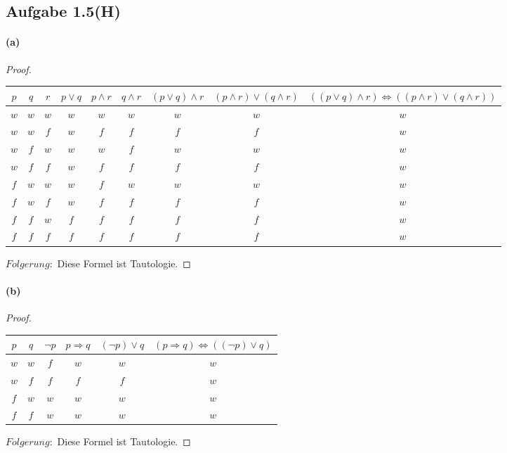 \newpage

\subsection{Aufgabe 1.5(H)}

\paragraph{(a)}
\begin{proof}
$ $\newline
\begin{center}
\begin{tabular}{||c|c|c||c|c|c|c|c|c||}
\hline
$p$ & $q$ & $r$ & $p\vee q$ & $p\wedge r$ & $q\wedge r$ & $(p\vee q)\wedge r$ & $(p\wedge r)\vee(q\wedge r)$ & $((p\vee q)\wedge r)\Leftrightarrow((p\wedge r)\vee(q\wedge r))$ \\
\hline
\hline
$w$ & $w$ & $w$ & $w$ & $w$ & $w$ & $w$ & $w$ & $w$ \\
$w$ & $w$ & $f$ & $w$ & $f$ & $f$ & $f$ & $f$ & $w$ \\
$w$ & $f$ & $w$ & $w$ & $w$ & $f$ & $w$ & $w$ & $w$ \\
$w$ & $f$ & $f$ & $w$ & $f$ & $f$ & $f$ & $f$ & $w$ \\
$f$ & $w$ & $w$ & $w$ & $f$ & $w$ & $w$ & $w$ & $w$ \\
$f$ & $w$ & $f$ & $w$ & $f$ & $f$ & $f$ & $f$ & $w$ \\
$f$ & $f$ & $w$ & $f$ & $f$ & $f$ & $f$ & $f$ & $w$ \\
$f$ & $f$ & $f$ & $f$ & $f$ & $f$ & $f$ & $f$ & $w$ \\
\hline
\end{tabular}
\end{center}
$Folgerung:$ Diese Formel ist Tautologie.
\end{proof}

\paragraph{(b)}
\begin{proof}
$ $\newline
\begin{center}
\begin{tabular}{||c|c||c|c|c|c||}
\hline
$p$ & $q$ & $\neg p$ & $p\Rightarrow q$ & $(\neg p)\vee q$ & $(p\Rightarrow q)\Leftrightarrow((\neg p)\vee q)$ \\
\hline
\hline
$w$ & $w$ & $f$ & $w$ & $w$ & $w$ \\
$w$ & $f$ & $f$ & $f$ & $f$ & $w$ \\
$f$ & $w$ & $w$ & $w$ & $w$ & $w$ \\
$f$ & $f$ & $w$ & $w$ & $w$ & $w$ \\
\hline
\end{tabular}
\end{center}
$Folgerung:$ Diese Formel ist Tautologie.
\end{proof}

